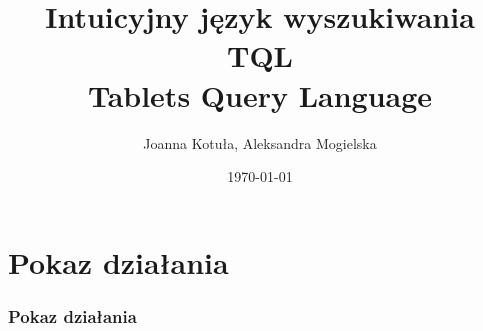 \documentclass[xcolor=dvipsnames,10pt]{beamer}
\author{Joanna Kotuła, Aleksandra Mogielska}
\institute[...]{Wydział Matematyki, Informatyki i Mechaniki\\
Uniwersytet Warszawski}
\title[Intuicyjny język wyszukiwania TQL (Tablets Query Language)]{\bf  Intuicyjny język wyszukiwania TQL \\
Tablets Query Language}
\date{\today}
\begin{document}
\begin{frame}
     \titlepage
\end{frame}

%    
% 
% 




%

 
\section{Pokaz działania}

\begin{frame}
     \frametitle{Pokaz działania}
\end{frame}
\end{document}
